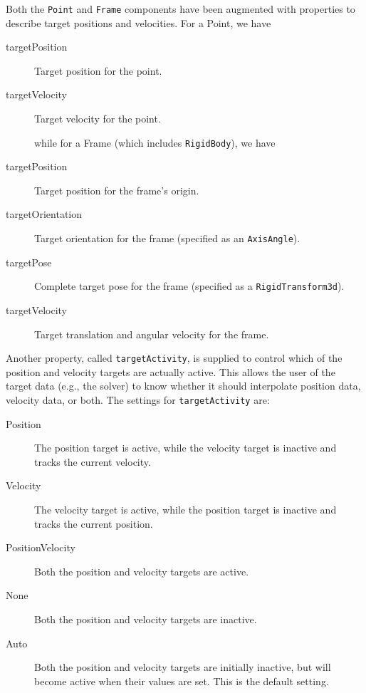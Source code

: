\documentclass{article}
\begin{document}
Both the {\tt Point} and {\tt Frame} components have been augmented with
properties to describe target positions and velocities. For a Point,
we have 

\begin{description}

\item[targetPosition] \mbox{}
Target position for the point.

\item[targetVelocity] \mbox{}
Target velocity for the point.

while for a Frame (which includes {\tt RigidBody}), we have

\item[targetPosition] \mbox{}
Target position for the frame's origin.

\item[targetOrientation] \mbox{}
Target orientation for the frame (specified as an {\tt AxisAngle}).

\item[targetPose] \mbox{}
Complete target pose for the frame (specified as a {\tt RigidTransform3d}).

\item[targetVelocity] \mbox{}
Target translation and angular velocity for the frame.

\end{description}

Another property, called {\tt targetActivity}, is supplied to control
which of the position and velocity targets are actually active.  This
allows the user of the target data (e.g., the solver) to know whether it should
interpolate position data, velocity data, or both. The settings for
{\tt targetActivity} are:

\begin{description}

\item[Position] \mbox{}
The position target is active, while the velocity target is inactive
and tracks the current velocity.

\item[Velocity] \mbox{}
The velocity target is active, while the position target is inactive
and tracks the current position.

\item[PositionVelocity] \mbox{}
Both the position and velocity targets are active.

\item[None] \mbox{}
Both the position and velocity targets are inactive.

\item[Auto] \mbox{}
Both the position and velocity targets are initially inactive, but
will become active when their values are set. This is the default setting.

\end{description}
\end{document}
